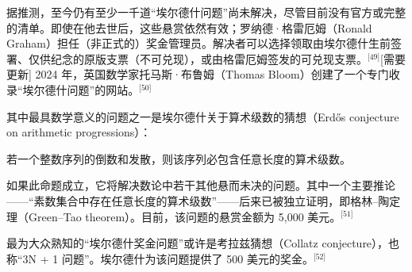 据推测，至今仍有至少一千道“埃尔德什问题”尚未解决，尽管目前没有官方或完整的清单。即使在他去世后，这些悬赏依然有效；罗纳德·格雷厄姆（Ronald Graham）担任（非正式的）奖金管理员。解决者可以选择领取由埃尔德什生前签署、仅供纪念的原版支票（不可兑现），或由格雷厄姆签发的可兑现支票。\(^\text{[49]}\)[需要更新] 2024 年，英国数学家托马斯·布鲁姆（Thomas Bloom）创建了一个专门收录“埃尔德什问题”的网站。\(^\text{[50]}\)

其中最具数学意义的问题之一是埃尔德什关于算术级数的猜想（Erdős conjecture on arithmetic progressions）：

若一个整数序列的倒数和发散，则该序列必包含任意长度的算术级数。

如果此命题成立，它将解决数论中若干其他悬而未决的问题。其中一个主要推论——“素数集合中存在任意长度的算术级数”——后来已被独立证明，即格林–陶定理（Green–Tao theorem）。目前，该问题的悬赏金额为 5,000 美元。\(^\text{[51]}\)

最为大众熟知的“埃尔德什奖金问题”或许是考拉兹猜想（Collatz conjecture），也称“3N + 1 问题”。埃尔德什为该问题提供了 500 美元的奖金。\(^\text{[52]}\)
